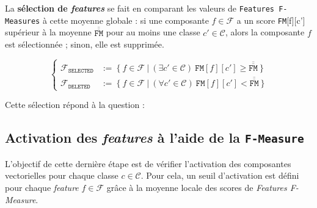 		
		La \textbf{sélection de \textit{features}} se fait en comparant les valeurs de \texttt{Features F-Measures} à cette moyenne globale : si une composante $f \in \mathcal{F}$ a un score \texttt{FM}[f][c'] supérieur à la moyenne $\overline{\overline{\texttt{FM}}}$ pour au moins une classe $c' \in \mathcal{C}$, alors la composante $f$ est sélectionnée ; sinon, elle est supprimée.
		
		\begin{equation}
			\label{equation:C.3.1-DESCRIPTION-IMPLEMENTATION-FEATURES-MAXIMIZATION-METRIC-FEATURES-SELECTION}
			\begin{cases}
				\mathcal{F}_{\texttt{SELECTED}}
					& :=~\bigl\{~
						f \in \mathcal{F}
						~\big|~
						(\exists c' \in \mathcal{C})~\texttt{FM}[f][c'] \geq \overline{\overline{\texttt{FM}}}
					~\bigr\} \\
				\mathcal{F}_{\texttt{DELETED}}
					& :=~\bigl\{~
						f \in \mathcal{F}
						~\big|~
						(\forall c' \in \mathcal{C})~\texttt{FM}[f][c'] < \overline{\overline{\texttt{FM}}}
					~\bigr\}
			\end{cases}
		\end{equation}
		
		\begin{leftBarAuthorOpinion}
			Cette sélection répond à la question :
		\end{leftBarAuthorOpinion}
	
	
	\subsection{Activation des \textit{features} à l'aide de la \texttt{F-Measure}}
	\label{annex:C.3.3-DESCRIPTION-IMPLEMENTATION-FEATURES-MAXIMIZATION-METRIC-ACTIVATION-FEATURES}
	
		L'objectif de cette dernière étape est de vérifier l'activation des composantes vectorielles pour chaque classe $c \in \mathcal{C}$.
		Pour cela, un seuil d'activation est défini pour chaque \textit{feature} $f \in \mathcal{F}$ grâce à la moyenne locale des scores de \textit{Features F-Measure}.
		\newline
		
